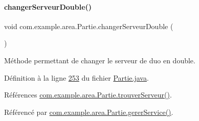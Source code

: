 \paragraph{\texorpdfstring{changer\+Serveur\+Double()}{changerServeurDouble()}}
{\footnotesize\ttfamily void com.\+example.\+area.\+Partie.\+changer\+Serveur\+Double (\begin{DoxyParamCaption}{ }\end{DoxyParamCaption})\hspace{0.3cm}{\ttfamily [private]}}



Méthode permettant de changer le serveur de duo en double. 



Définition à la ligne \hyperlink{_partie_8java_source_l00253}{253} du fichier \hyperlink{_partie_8java_source}{Partie.\+java}.



Références \hyperlink{_partie_8java_source_l00315}{com.\+example.\+area.\+Partie.\+trouver\+Serveur()}.



Référencé par \hyperlink{_partie_8java_source_l00220}{com.\+example.\+area.\+Partie.\+gerer\+Service()}.


